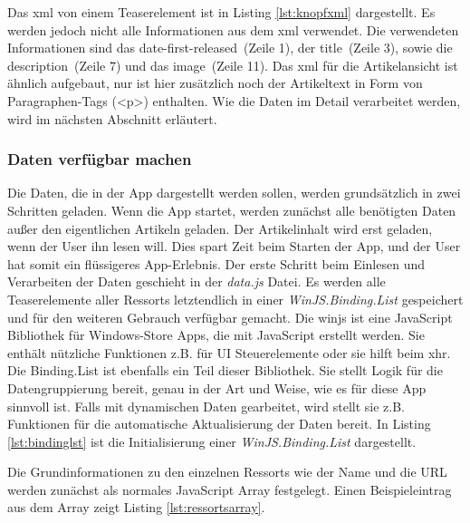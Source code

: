 \documentclass[12pt,a4paper,bibtotoc,abstracton]{scrartcl}
\begin{document}
Das \ac{xml} von einem Teaserelement ist in Listing \ref{lst:knopfxml} dargestellt. Es werden jedoch nicht alle Informationen aus dem \ac{xml} verwendet. Die verwendeten Informationen sind das \glqq date-first-released\grqq\ (Zeile 1), der \glqq title\grqq\ (Zeile 3), sowie die \glqq description\grqq\ (Zeile 7) und das \glqq image\grqq\ (Zeile 11). Das \ac{xml} für die Artikelansicht ist ähnlich aufgebaut, nur ist hier zusätzlich noch der Artikeltext in Form von Paragraphen-Tags (<p>) enthalten. Wie die Daten im Detail verarbeitet werden, wird im nächsten Abschnitt erläutert.

\subsubsection{Daten verfügbar machen}
\label{subsubsec:datenverfügbarmachen}
Die Daten, die in der App dargestellt werden sollen, werden grundsätzlich in zwei Schritten geladen. Wenn die App startet, werden zunächst alle benötigten Daten außer den eigentlichen Artikeln geladen. Der Artikelinhalt wird erst geladen, wenn der User ihn lesen will. Dies spart Zeit beim Starten der App, und der User hat somit ein flüssigeres App-Erlebnis. Der erste Schritt beim Einlesen und Verarbeiten der Daten geschieht in der \textit{data.js} Datei. Es werden alle Teaserelemente aller Ressorts letztendlich in einer  \textit{WinJS.Binding.List} gespeichert und für den weiteren Gebrauch verfügbar gemacht. Die \ac{winjs} ist eine JavaScript Bibliothek für Windows-Store Apps, die mit JavaScript erstellt werden. Sie enthält nützliche Funktionen z.B. für UI Steuerelemente oder sie hilft beim \ac{xhr}. Die Binding.List ist ebenfalls ein Teil dieser Bibliothek. Sie stellt Logik für die Datengruppierung bereit, genau in der Art und Weise, wie es für diese App sinnvoll ist. Falls mit dynamischen Daten gearbeitet, wird stellt sie z.B. Funktionen für die automatische Aktualisierung der Daten bereit. In Listing \ref{lst:bindinglst} ist die Initialisierung einer \textit{WinJS.Binding.List} dargestellt.

\begin{minipage}{\linewidth}

\end{minipage}

Die Grundinformationen zu den einzelnen Ressorts wie der Name und die URL werden zunächst als normales JavaScript Array festgelegt. Einen Beispieleintrag aus dem Array zeigt Listing \ref{lst:ressortsarray}.

\begin{minipage}{\linewidth}

\end{minipage}
\end{document}
